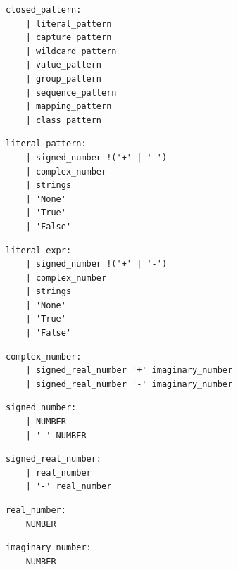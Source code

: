 \noindent\textbf{\texttt{}}\par
\begin{lstlisting}
closed_pattern:
    | literal_pattern
    | capture_pattern
    | wildcard_pattern
    | value_pattern
    | group_pattern
    | sequence_pattern
    | mapping_pattern
    | class_pattern
\end{lstlisting}

\noindent\textbf{\texttt{}}\par
\begin{lstlisting}
literal_pattern:
    | signed_number !('+' | '-')
    | complex_number
    | strings
    | 'None'
    | 'True'
    | 'False'
\end{lstlisting}

\noindent\textbf{\texttt{}}\par
\begin{lstlisting}
literal_expr:
    | signed_number !('+' | '-')
    | complex_number
    | strings
    | 'None'
    | 'True'
    | 'False'
\end{lstlisting}

\noindent\textbf{\texttt{}}\par
\begin{lstlisting}
complex_number:
    | signed_real_number '+' imaginary_number
    | signed_real_number '-' imaginary_number
\end{lstlisting}

\noindent\textbf{\texttt{}}\par
\begin{lstlisting}
signed_number:
    | NUMBER
    | '-' NUMBER
\end{lstlisting}

\noindent\textbf{\texttt{}}\par
\begin{lstlisting}
signed_real_number:
    | real_number
    | '-' real_number
\end{lstlisting}

\noindent\textbf{\texttt{}}\par
\begin{lstlisting}
real_number:
    NUMBER
\end{lstlisting}

\noindent\textbf{\texttt{}}\par
\begin{lstlisting}
imaginary_number:
    NUMBER
\end{lstlisting}

